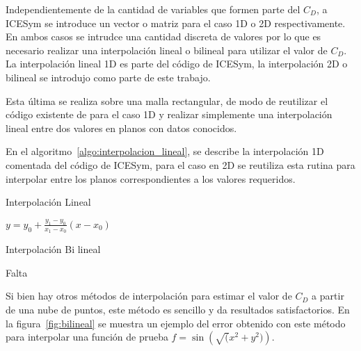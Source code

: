 Independientemente de la cantidad de variables que formen parte del $C_{D}$, a
ICESym se introduce un vector o matriz para el caso 1D o 2D respectivamente.
%
En ambos casos se intrudce una cantidad discreta de valores por lo que es
necesario realizar una interpolación lineal o bilineal para utilizar el valor de
$C_{D}$.
%
La interpolación lineal 1D es parte del código de ICESym, la interpolación 2D o
bilineal se introdujo como parte de este trabajo.

Esta última se realiza sobre una malla rectangular, de modo de reutilizar el
código existente de para el caso 1D y realizar  simplemente una interpolación
lineal entre dos valores en planos con datos conocidos.

En el algoritmo~\ref{algo:interpolacion_lineal}, se describe la interpolación 1D
comentada del código de ICESym, para el caso en 2D se reutiliza esta rutina para
interpolar entre los planos correspondientes a los valores requeridos.

\begin{algorithm}\caption{Interpolación Lineal}\label{algo:interpolacion_lineal}
  \BlankLine
  $y = y_{0}+\frac{y_{1}-y_{0}}{x_{1}-x_{0}}(x-x_{0})$\;
  \;
\end{algorithm}


\begin{algorithm}\caption{Interpolación Bi lineal}\label{algo:interpolacion_bilineal}
  \BlankLine
  Falta\;
\end{algorithm}

Si bien hay otros métodos de interpolación para estimar el valor de $C_D$ a
partir de una nube de puntos, este método es sencillo y da resultados
satisfactorios.
%
En la figura~\ref{fig:bilineal} se muestra un ejemplo del error obtenido con
este método para interpolar una función de prueba $f=\sin\left(\sqrt(x^2 + y^2)\right)$.

